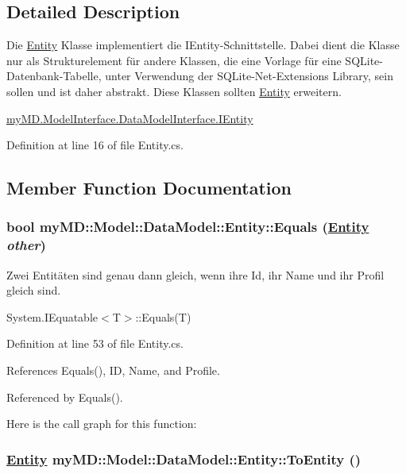 \subsection{Detailed Description}
Die \hyperlink{classmy_m_d_1_1_model_1_1_data_model_1_1_entity}{Entity} Klasse implementiert die IEntity-Schnittstelle. Dabei dient die Klasse nur als Strukturelement f\"{u}r andere Klassen, die eine Vorlage f\"{u}r eine SQLite-Datenbank-Tabelle, unter Verwendung der SQLite-Net-Extensions Library, sein sollen und ist daher abstrakt. Diese Klassen sollten \hyperlink{classmy_m_d_1_1_model_1_1_data_model_1_1_entity}{Entity} erweitern. 

\hyperlink{interfacemy_m_d_1_1_model_interface_1_1_data_model_interface_1_1_i_entity}{my\-MD.Model\-Interface.Data\-Model\-Interface.IEntity} 



Definition at line 16 of file Entity.cs.

\subsection{Member Function Documentation}
\hypertarget{classmy_m_d_1_1_model_1_1_data_model_1_1_entity_a75e8a3dc731ab0e2966da6f482119fc}{
\subsubsection[Equals]{\setlength{\rightskip}{0pt plus 5cm}bool my\-MD::Model::Data\-Model::Entity::Equals (\hyperlink{classmy_m_d_1_1_model_1_1_data_model_1_1_entity}{Entity} {\em other})}}
\label{d7/d0a/classmy_m_d_1_1_model_1_1_data_model_1_1_entity_a75e8a3dc731ab0e2966da6f482119fc}


Zwei Entit\"{a}ten sind genau dann gleich, wenn ihre Id, ihr Name und ihr Profil gleich sind. 

System.IEquatable$<$T$>$::Equals(T) 

Definition at line 53 of file Entity.cs.

References Equals(), ID, Name, and Profile.

Referenced by Equals().

Here is the call graph for this function:\hypertarget{classmy_m_d_1_1_model_1_1_data_model_1_1_entity_1a8b26c73ec083d6930f1f39ce916df3}{
\subsubsection[ToEntity]{\setlength{\rightskip}{0pt plus 5cm}\hyperlink{classmy_m_d_1_1_model_1_1_data_model_1_1_entity}{Entity} my\-MD::Model::Data\-Model::Entity::To\-Entity ()}}
\label{d7/d0a/classmy_m_d_1_1_model_1_1_data_model_1_1_entity_1a8b26c73ec083d6930f1f39ce916df3}


